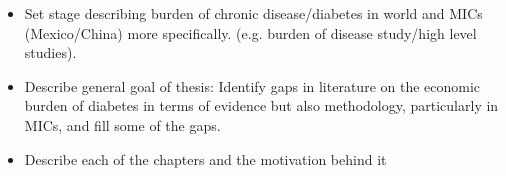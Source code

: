 
\begin{itemize}
\item Set stage describing burden of chronic disease/diabetes in world and MICs (Mexico/China) more specifically.  (e.g. burden of disease study/high level studies).
\item Describe general goal of thesis:
\subitem Identify gaps in literature on the economic burden of diabetes in terms of evidence but also methodology, particularly in MICs, and fill some of the gaps.
\item Describe each of the chapters and the motivation behind it
\subitem 
\end{itemize}

